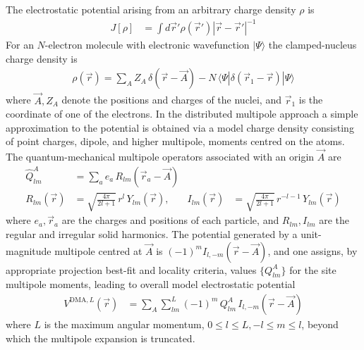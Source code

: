 \documentclass[journal=jacsat,manuscript=article]{achemso}
\begin{document}
The electrostatic potential arising from an arbitrary charge density $\rho$ is
\begin{align}
    J[\rho] &= \int d\vec r' \rho(\vec r') |\vec r-\vec r'|^{-1}
\end{align}
For an $N$-electron molecule with electronic wavefunction $|\Psi\rangle$ the clamped-nucleus charge density is
\begin{align}
    \rho(\vec r) = \sum_A Z_A \,\delta(\vec r - \vec A)
    -N \,\langle\Psi|\delta(\vec r_1-\vec r)|\Psi\rangle
\end{align}
where $\vec A, Z_A$ denote the positions and charges of the nuclei, and
$\vec r_1$ is the coordinate of one of the electrons.
In the distributed multipole approach\cite{Stone1981,Stone1985DistributedAnalysis,Stone2005DistributedSets.} a simple approximation to the potential is
obtained via  a model charge density consisting of point charges, dipole, and higher multipole, moments centred on the atoms.
The quantum-mechanical multipole operators associated with an origin $\vec A$ are\cite{Stone2013}
\begin{align}
    \hat Q_{lm}^A &= \sum_a e_a\, R_{lm}(\vec r_a-\vec A)
    \\
R_{lm}(\vec r)&=\sqrt{\frac{4\pi}{2l+1}}\,r^l \, Y_{lm}(\vec r)
,&
I_{lm}(\vec r)&=\sqrt{\frac{4\pi}{2l+1}}\,r^{-l-1} \, Y_{lm}(\vec r)
\end{align}
where
$e_a, \vec r_a$ are the charges and positions of each particle, and 
$R_{lm}, I_{lm}$ are the regular and irregular solid harmonics\cite{Whittaker1927, Stone2013}.
The potential generated by a unit-magnitude multipole  centred at $\vec A$ is
    $ (-1)^m I_{l,-m}(\vec r-\vec A)$,
and one assigns, by appropriate projection best-fit and locality criteria\cite{Stone1981,Stone1985DistributedAnalysis,Stone2005DistributedSets.},
values $\{Q^A_{lm}\}$ for the site multipole moments, leading to overall model electrostatic potential
\begin{align}
    V^{\text{DMA},L}(\vec r) &= \sum_A \sum_{lm}^L(-1)^m\, Q^A_{lm}\, I_{l,-m}(\vec r-\vec A)
\end{align}
where $L$ is the
maximum angular momentum, $0\le l\le L, -l\le m\le l$, beyond which the multipole expansion is truncated.
\end{document}

